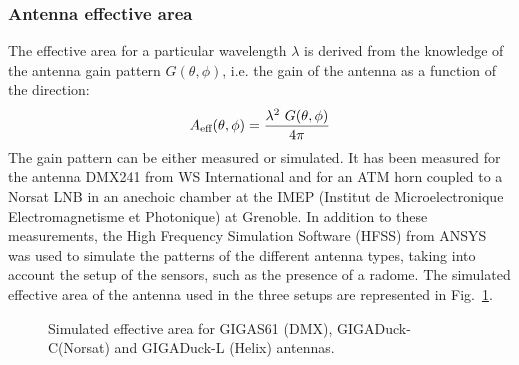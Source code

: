 \subsubsection{Antenna effective area}
The effective  area for a  particular wavelength $\lambda$  is derived
from  the knowledge  of the  antenna gain  pattern  $G(\theta, \phi)$,
i.e. the gain of the antenna as a function of the direction:
\begin{eqnarray} \label{eq:aeff}
A_{\text{eff}} (\theta, \phi) = {{\lambda^2\ G(\theta, \phi)}\over{4 \pi} } 
\end{eqnarray}
The  gain pattern can  be either  measured or  simulated. It  has been
measured for the  antenna DMX241 from WS International  and for an ATM
horn  coupled to  a Norsat  LNB  in an  anechoic chamber  at the  IMEP
(Institut  de Microelectronique  Electromagnetisme  et Photonique)  at
Grenoble.   In  addition to  these  measurements,  the High  Frequency
Simulation Software (HFSS) from ANSYS~\cite{hfss} was used to simulate
the patterns of  the different antenna types, taking  into account the
setup of the sensors, such as  the presence of a radome. The simulated
effective area of the antenna used in the three setups are represented
in Fig.~\ref{fig:aeff}.
\begin{figure}[!ht]
 \centering
 \hspace*{-3ex}
 \caption{Simulated     effective    area    for     \mbox{GIGAS61}    (DMX),
   \mbox{GIGADuck-C}(Norsat) and \mbox{GIGADuck-L} (Helix) antennas.}
 \label{fig:aeff}
\end{figure}

